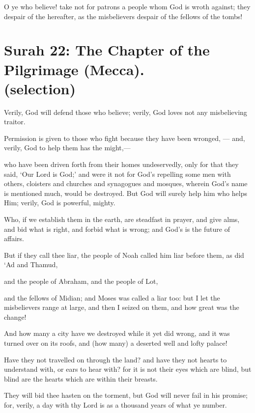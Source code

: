 \documentclass[fontsize=14pt, letterpaper, notitlepage, openany, DIV=12]{scrbook} %
\begin{document}
\noindent[60:13]
O ye who believe! take not for patrons a people whom God is wroth against; they despair
of the hereafter, as the misbelievers despair of the fellows of the tombs!


\section[Surah 22: The Chapter of the Pilgrimage (Mecca).]{Surah 22: The Chapter of the Pilgrimage (Mecca).\\ (selection)}


\noindent[22:38]
Verily, God will defend those who believe; verily, God loves not any misbelieving
traitor.

\noindent[22:39]
Permission is given to those who fight because they have been wronged, --- and, verily,
God to help them has the might,---

\noindent[22:40]
who have been driven forth from their homes undeservedly, only for that they said, `Our
Lord is God;' and were it not for God's repelling some men with others, cloisters and churches
and synagogues and mosques, wherein God's name is mentioned much, would be destroyed. But
God will surely help him who helps Him; verily, God is powerful, mighty.

\noindent[22:41]
Who, if we establish them in the earth, are steadfast in prayer, and give alms, and bid
what is right, and forbid what is wrong; and God's is the future of affairs.

\noindent[22:42]
But if they call thee liar, the people of Noah called him liar before them, as did `Ad and
Thamud,

\noindent[22:43]
and the people of Abraham, and the people of Lot,

\noindent[22:44]
and the fellows of Midian; and Moses was called a liar too: but I let the misbelievers
range at large, and then I seized on them, and how great was the change!

\noindent[22:45]
And how many a city have we destroyed while it yet did wrong, and it was turned over
on its roofs, and (how many) a deserted well and lofty palace!

\noindent[22:46]
Have they not travelled on through the land? and have they not hearts to understand with,
or ears to hear with? for it is not their eyes which are blind, but blind are the hearts which are
within their breasts.

\noindent[22:47]
They will bid thee hasten on the torment, but God will never fail in his promise; for,
verily, a day with thy Lord is as a thousand years of what ye number.
\end{document}
